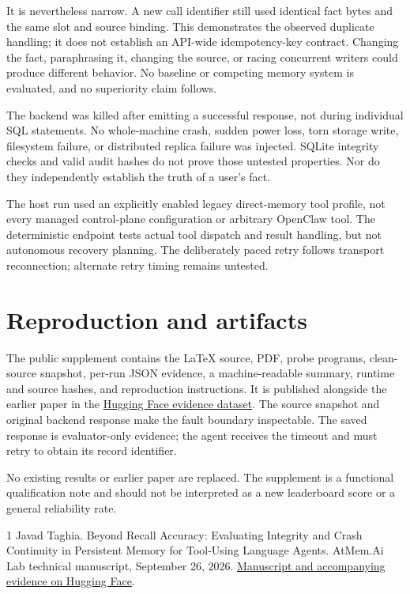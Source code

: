 \documentclass[10pt,twocolumn]{article}
\begin{document}
It is nevertheless narrow. A new call identifier still used identical fact
bytes and the same slot and source binding. This demonstrates the observed
duplicate handling; it does not establish an API-wide idempotency-key contract.
Changing the fact, paraphrasing it, changing the source, or racing concurrent
writers could produce different behavior. No baseline or competing memory
system is evaluated, and no superiority claim follows.

The backend was killed after emitting a successful response, not during
individual SQL statements. No whole-machine crash, sudden power loss, torn
storage write, filesystem failure, or distributed replica failure was injected.
SQLite integrity checks and valid audit hashes do not prove those untested
properties. Nor do they independently establish the truth of a user's fact.

The host run used an explicitly enabled legacy direct-memory tool profile,
not every managed control-plane configuration or arbitrary OpenClaw tool.
The deterministic endpoint tests actual tool dispatch and result handling,
but not autonomous recovery planning. The deliberately paced retry follows
transport reconnection; alternate retry timing remains untested.

\section{Reproduction and artifacts}
The public supplement contains the LaTeX source, PDF, probe programs,
clean-source snapshot, per-run JSON evidence, a machine-readable summary,
runtime and source hashes, and reproduction instructions. It is published
alongside the earlier paper in the
\href{https://huggingface.co/datasets/atmem/memory-integrity-continuity/tree/main/openclaw-lost-ack-20260927}{Hugging Face evidence dataset}.
The source snapshot and original backend response make the fault boundary
inspectable. The saved response is evaluator-only evidence; the agent receives
the timeout and must retry to obtain its record identifier.

No existing results or earlier paper are replaced. The supplement is a
functional qualification note and should not be interpreted as a new
leaderboard score or a general reliability rate.

\begin{thebibliography}{1}
Javad Taghia.
\newblock Beyond Recall Accuracy: Evaluating Integrity and Crash Continuity
in Persistent Memory for Tool-Using Language Agents.
\newblock AtMem.Ai Lab technical manuscript, September 26, 2026.
\newblock \href{https://huggingface.co/datasets/atmem/memory-integrity-continuity/blob/main/paper/atmem-memory-integrity-and-continuity.pdf}{Manuscript and accompanying evidence on Hugging Face}.
\end{thebibliography}
\end{document}
